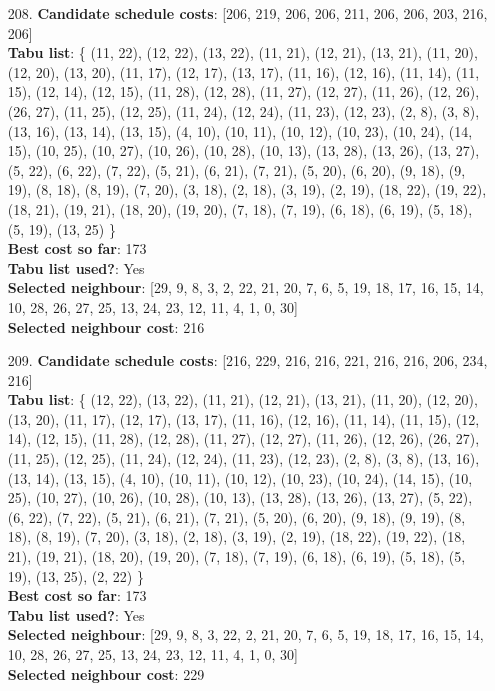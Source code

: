 \documentclass[fleqn]{article}
\begin{document}
\begin{itemize}
    \item[208.] \textbf{Candidate schedule costs}: [206, 219, 206, 206, 211, 206, 206, 203, 216, 206] \\
    \textbf{Tabu list}: \{ (11, 22), (12, 22), (13, 22), (11, 21), (12, 21), (13, 21), (11, 20), (12, 20), (13, 20), (11, 17), (12, 17), (13, 17), (11, 16), (12, 16), (11, 14), (11, 15), (12, 14), (12, 15), (11, 28), (12, 28), (11, 27), (12, 27), (11, 26), (12, 26), (26, 27), (11, 25), (12, 25), (11, 24), (12, 24), (11, 23), (12, 23), (2, 8), (3, 8), (13, 16), (13, 14), (13, 15), (4, 10), (10, 11), (10, 12), (10, 23), (10, 24), (14, 15), (10, 25), (10, 27), (10, 26), (10, 28), (10, 13), (13, 28), (13, 26), (13, 27), (5, 22), (6, 22), (7, 22), (5, 21), (6, 21), (7, 21), (5, 20), (6, 20), (9, 18), (9, 19), (8, 18), (8, 19), (7, 20), (3, 18), (2, 18), (3, 19), (2, 19), (18, 22), (19, 22), (18, 21), (19, 21), (18, 20), (19, 20), (7, 18), (7, 19), (6, 18), (6, 19), (5, 18), (5, 19), (13, 25) \} \\
    \textbf{Best cost so far}: 173 \\
    \textbf{Tabu list used?}: Yes \\
    \textbf{Selected neighbour}: [29, 9, 8, 3, 2, 22, 21, 20, 7, 6, 5, 19, 18, 17, 16, 15, 14, 10, 28, 26, 27, 25, 13, 24, 23, 12, 11, 4, 1, 0, 30] \\
    \textbf{Selected neighbour cost}: 216
      

    \item[209.] \textbf{Candidate schedule costs}: [216, 229, 216, 216, 221, 216, 216, 206, 234, 216] \\
    \textbf{Tabu list}: \{ (12, 22), (13, 22), (11, 21), (12, 21), (13, 21), (11, 20), (12, 20), (13, 20), (11, 17), (12, 17), (13, 17), (11, 16), (12, 16), (11, 14), (11, 15), (12, 14), (12, 15), (11, 28), (12, 28), (11, 27), (12, 27), (11, 26), (12, 26), (26, 27), (11, 25), (12, 25), (11, 24), (12, 24), (11, 23), (12, 23), (2, 8), (3, 8), (13, 16), (13, 14), (13, 15), (4, 10), (10, 11), (10, 12), (10, 23), (10, 24), (14, 15), (10, 25), (10, 27), (10, 26), (10, 28), (10, 13), (13, 28), (13, 26), (13, 27), (5, 22), (6, 22), (7, 22), (5, 21), (6, 21), (7, 21), (5, 20), (6, 20), (9, 18), (9, 19), (8, 18), (8, 19), (7, 20), (3, 18), (2, 18), (3, 19), (2, 19), (18, 22), (19, 22), (18, 21), (19, 21), (18, 20), (19, 20), (7, 18), (7, 19), (6, 18), (6, 19), (5, 18), (5, 19), (13, 25), (2, 22) \} \\
    \textbf{Best cost so far}: 173 \\
    \textbf{Tabu list used?}: Yes \\
    \textbf{Selected neighbour}: [29, 9, 8, 3, 22, 2, 21, 20, 7, 6, 5, 19, 18, 17, 16, 15, 14, 10, 28, 26, 27, 25, 13, 24, 23, 12, 11, 4, 1, 0, 30] \\
    \textbf{Selected neighbour cost}: 229
      


\end{itemize}
\end{document}
